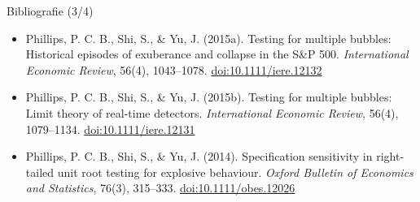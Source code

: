 \begin{frame}{Bibliografie (3/4)}
\begin{itemize}
    \item Phillips, P. C. B., Shi, S., \& Yu, J. (2015a). Testing for multiple bubbles: Historical episodes of exuberance and collapse in the S\&P 500. \textit{International Economic Review}, 56(4), 1043--1078. \href{https://doi.org/10.1111/iere.12132}{doi:10.1111/iere.12132}
    \item Phillips, P. C. B., Shi, S., \& Yu, J. (2015b). Testing for multiple bubbles: Limit theory of real-time detectors. \textit{International Economic Review}, 56(4), 1079--1134. \href{https://doi.org/10.1111/iere.12131}{doi:10.1111/iere.12131}
    \item Phillips, P. C. B., Shi, S., \& Yu, J. (2014). Specification sensitivity in right-tailed unit root testing for explosive behaviour. \textit{Oxford Bulletin of Economics and Statistics}, 76(3), 315--333. \href{https://doi.org/10.1111/obes.12026}{doi:10.1111/obes.12026}
\end{itemize}
\end{frame}

